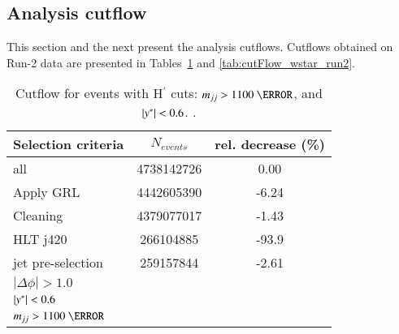%
%
%


\subsection{Analysis cutflow}

This section and the next present the analysis cutflows. Cutflows obtained on
Run-2 data are presented in Tables~\ref{tab:cutFlow_resonance_run2} and 
\ref{tab:cutFlow_wstar_run2}.

\begin{table}[htbp]
	\centering
	\begin{tabular}{l|c|c}
		\hline\hline
		Selection criteria & $N_{events}$ & rel. decrease (\%) \\
		\hline
		all      &	4738142726	&	0.00	\\
		Apply GRL 	& 	4442605390        & 	-6.24	 \\
		Cleaning	 & 	4379077017	 & 	-1.43	 \\
		HLT j420	 & 	266104885	 & 	-93.9	 \\
		jet pre-selection	 &     259157844         &      -2.61    \\
		$|\Delta\phi| > 1.0$	 & 		 & 		 \\
		$|y^\ast| < 0.6$	 & 		 & 		 \\
		$\mjj>1100~\GeV$	 & 		 & 		 \\
		\hline\hline
	\end{tabular}
	\caption{Cutflow for
		events with H$^\prime$ cuts:  $\mjj>1100~\GeV$, and $|y^\ast|<0.6$. .
		\label{tab:cutFlow_resonance_run2} }
\end{table}


